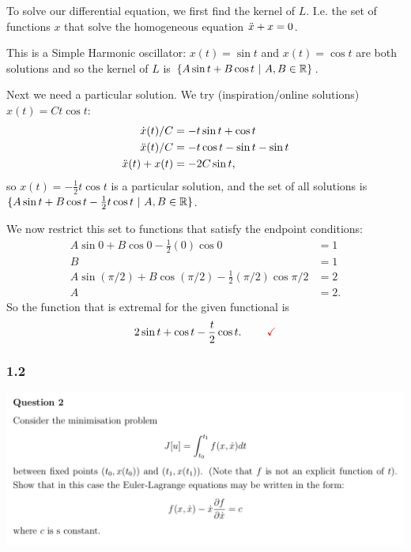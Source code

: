 \begin{enumerate}
  To solve our differential equation, we first find the kernel of $L$. I.e. the set of functions
  $x$ that solve the homogeneous equation $\ddot{x} + x = 0$.

  This is a Simple Harmonic oscillator: $x(t) = \sin t$ and $x(t) = \cos t$ are both
  solutions and so the kernel of $L$ is $\{A\sin t + B\cos t ~|~ A, B \in \mathbb{R}\}$.


  Next we need a particular solution. We try (inspiration/online solutions) $x(t) = Ct\cos t$:
  \begin{align*}
    \dot{x}(t)/C      &= -t\sin t + \cos t \\
    \ddot{x}(t)/C      &= -t\cos t - \sin t - \sin t \\
    \ddot{x}(t) + x(t) &= -2C\sin t,
  \end{align*}
  so $x(t) = -\frac{1}{2}t\cos t$ is a particular solution, and the set of all solutions is
  $\{A\sin t + B\cos t - \frac{1}{2}t\cos t ~|~ A, B \in \mathbb{R}\}$.

  We now restrict this set to functions that satisfy the endpoint conditions:
  \begin{align*}
    A\sin 0 + B\cos 0 - \frac{1}{2}(0)\cos 0                     &= 1 \\
    B                                                            &= 1 \\
    A\sin (\pi/2) + B\cos (\pi/2) - \frac{1}{2}(\pi/2)\cos \pi/2 &= 2 \\
    A                                                            &= 2.
  \end{align*}
  So the function that is extremal for the given functional is
  \begin{align*}
    2\sin t + \cos t - \frac{t}{2}\cos t. ~~~~~~~ \textcolor{red}{\checkmark}
  \end{align*}
\end{enumerate}



\subsubsection{1.2}
\begin{mdframed}
  \includegraphics[width=400pt]{img/cov-haliakis-ooc-1-2.png}
\end{mdframed}


